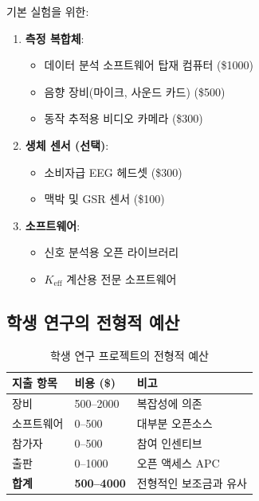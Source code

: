 \documentclass[12pt,a4paper]{article}
\begin{document}
	기본 실험을 위한:
	\begin{enumerate}
		\item \textbf{측정 복합체}:
		\begin{itemize}
			\item 데이터 분석 소프트웨어 탑재 컴퓨터 (\$1000)
			\item 음향 장비(마이크, 사운드 카드) (\$500)
			\item 동작 추적용 비디오 카메라 (\$300)
		\end{itemize}
		
		\item \textbf{생체 센서 (선택)}:
		\begin{itemize}
			\item 소비자급 EEG 헤드셋 (\$300)
			\item 맥박 및 GSR 센서 (\$100)
		\end{itemize}
		
		\item \textbf{소프트웨어}:
		\begin{itemize}
			\item 신호 분석용 오픈 라이브러리
			\item \(K_{\mathrm{eff}}\) 계산용 전문 소프트웨어
		\end{itemize}
	\end{enumerate}
	
	\subsection{학생 연구의 전형적 예산}
	
	\begin{table}[h]
		\centering
		\begin{tabular}{p{}p{}p{}}
			\toprule
			\textbf{지출 항목} & \textbf{비용 (\$)} & \textbf{비고} \\
			\midrule
			장비 & 500–2000 & 복잡성에 의존 \\
			소프트웨어 & 0–500 & 대부분 오픈소스 \\
			참가자 & 0–500 & 참여 인센티브 \\
			출판 & 0–1000 & 오픈 액세스 APC \\
			\midrule
			\textbf{합계} & \textbf{500–4000} & 전형적인 보조금과 유사 \\
			\bottomrule
		\end{tabular}
		\caption{학생 연구 프로젝트의 전형적 예산}
		\label{tab:student-budget}
	\end{table}
	
\end{document}
